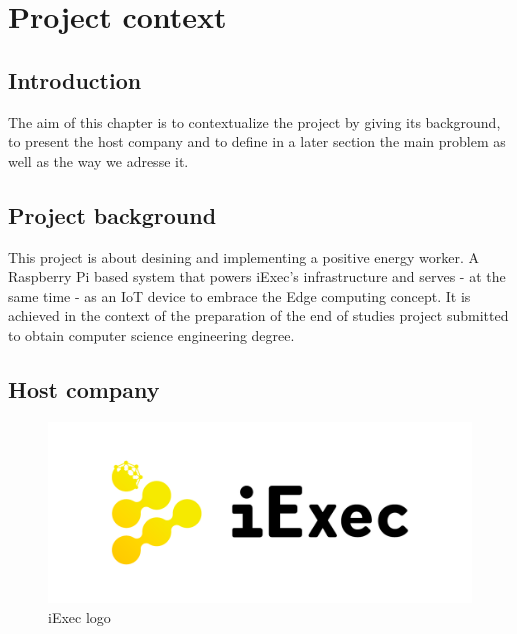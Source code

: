 
\chapter{Project context}

\section{Introduction}
  The aim of this chapter is to contextualize the project by giving its background,
  to present the host company and to define in a later section the main problem as well
  as the way we adresse it.

\section{Project background}
  This project is about desining and implementing a positive energy worker.
  A Raspberry Pi based system that powers iExec's infrastructure and serves - at the same
  time - as an IoT device to embrace the Edge computing concept.
  It is achieved in the context of the preparation of the end of studies project submitted to
  obtain computer science engineering degree.

\section{Host company}

  \begin{figure}[!h]\centering
    \includegraphics[width=.5\columnwidth]{2-Context/figs/iExec-logo.pdf}
    \caption{iExec logo}
  \end{figure}

